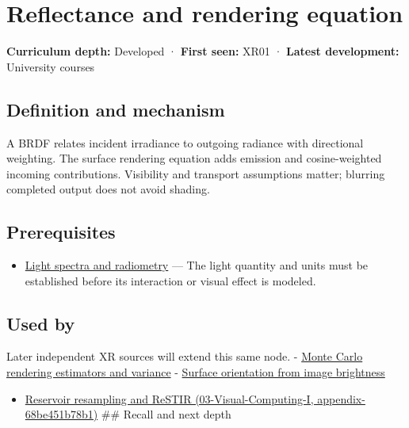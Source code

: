 \hypertarget{appendix-96da0b153b77}{}
\section{Reflectance and rendering equation}\label{appendix-96da0b153b77-reflectance-and-rendering-equation}

\textbf{Curriculum depth:} Developed · \textbf{First seen:} XR01 · \textbf{Latest development:} University courses

\subsection{Definition and mechanism}\label{appendix-96da0b153b77-definition-and-mechanism}

A BRDF relates incident irradiance to outgoing radiance with directional weighting. The surface rendering equation adds emission and cosine-weighted incoming contributions. Visibility and transport assumptions matter; blurring completed output does not avoid shading.

\subsection{Prerequisites}\label{appendix-96da0b153b77-prerequisites}

\begin{itemize}
\tightlist
\item
  \hyperref[appendix-215c2570199b]{Light spectra and radiometry} --- The light quantity and units must be established before its interaction or visual effect is modeled.
\end{itemize}

\subsection{Used by}\label{appendix-96da0b153b77-used-by}

Later independent XR sources will extend this same node. - \hyperref[appendix-031e02bf28af]{Monte Carlo rendering estimators and variance} - \hyperref[appendix-89b2d5b7c9e1]{Surface orientation from image brightness}

\begin{itemize}
\tightlist
\item
  \href{../03-Visual-Computing-I/main.pdf\#nameddest=appendix-68be451b78b1}{Reservoir resampling and ReSTIR (03-Visual-Computing-I, appendix-68be451b78b1)} \#\# Recall and next depth
\end{itemize}

